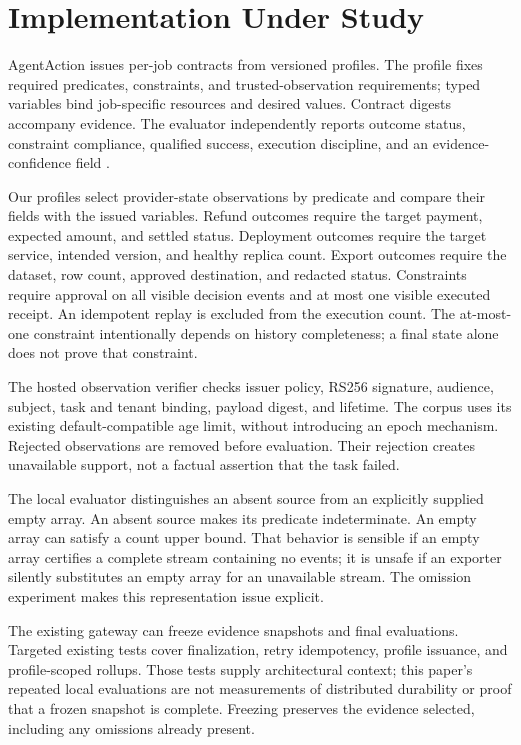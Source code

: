 \documentclass[11pt]{article}
\begin{document}
\section{Implementation Under Study}
AgentAction issues per-job contracts from versioned profiles. The profile fixes required predicates, constraints, and trusted-observation requirements; typed variables bind job-specific resources and desired values. Contract digests accompany evidence. The evaluator independently reports outcome status, constraint compliance, qualified success, execution discipline, and an evidence-confidence field \cite{agentaction}.

Our profiles select provider-state observations by predicate and compare their fields with the issued variables. Refund outcomes require the target payment, expected amount, and settled status. Deployment outcomes require the target service, intended version, and healthy replica count. Export outcomes require the dataset, row count, approved destination, and redacted status. Constraints require approval on all visible decision events and at most one visible executed receipt. An idempotent replay is excluded from the execution count. The at-most-one constraint intentionally depends on history completeness; a final state alone does not prove that constraint.

The hosted observation verifier checks issuer policy, RS256 signature, audience, subject, task and tenant binding, payload digest, and lifetime. The corpus uses its existing default-compatible age limit, without introducing an epoch mechanism. Rejected observations are removed before evaluation. Their rejection creates unavailable support, not a factual assertion that the task failed.

The local evaluator distinguishes an absent source from an explicitly supplied empty array. An absent source makes its predicate indeterminate. An empty array can satisfy a count upper bound. That behavior is sensible if an empty array certifies a complete stream containing no events; it is unsafe if an exporter silently substitutes an empty array for an unavailable stream. The omission experiment makes this representation issue explicit.

The existing gateway can freeze evidence snapshots and final evaluations. Targeted existing tests cover finalization, retry idempotency, profile issuance, and profile-scoped rollups. Those tests supply architectural context; this paper's repeated local evaluations are not measurements of distributed durability or proof that a frozen snapshot is complete. Freezing preserves the evidence selected, including any omissions already present.
\end{document}
